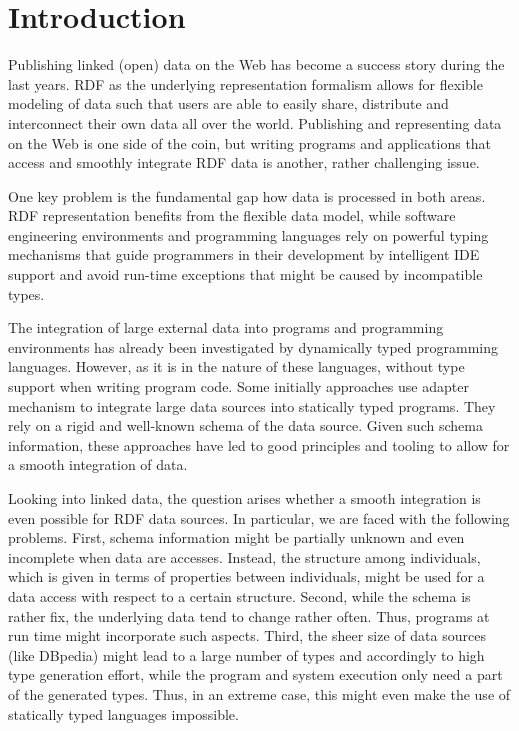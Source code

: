 \documentclass{llncs} %
\begin{document}
\section{Introduction}
\label{sec:intro}


Publishing linked (open) data on the Web has become a success story during the last years.
RDF as the underlying representation formalism allows for flexible modeling of data such that
users are able to easily share, distribute and interconnect their own data all over the world.
Publishing and representing data on the Web is one side of the coin, but writing programs
and applications that access and smoothly integrate RDF data  is another, rather challenging issue.

One key problem is the fundamental gap how data is processed in both areas.
RDF representation benefits from the flexible data model,
while software engineering environments and programming languages rely on powerful typing mechanisms
that guide programmers in their development by intelligent IDE support
and avoid run-time exceptions that might be caused by incompatible types.


The integration of large external data into programs and programming environments
has already been investigated by dynamically typed programming languages.
However, as it is in the nature of these languages, without type support when writing program code.
Some initially approaches use adapter mechanism to integrate large data sources into statically
typed programs. They rely on a rigid and well-known schema of the data source.
Given such schema information, these approaches have led to good principles and tooling to
allow for a smooth integration of data.

Looking into linked data, the question arises whether
a smooth integration is even possible for RDF data sources.
In particular, we are faced with the following problems.
First, schema information might be partially unknown and even incomplete when data are accesses.
Instead, the structure among individuals, which is given in terms of properties between individuals,
might be used for a data access with respect to a certain structure.
Second, while the schema is rather fix, the underlying data tend to change rather often.
Thus, programs at run time might incorporate such aspects.
Third, the sheer size of data sources (like DBpedia)  might lead to a large number of types
and accordingly to high type generation effort, while the program and system execution
only need a part of the generated types.
Thus, in an extreme case, this might even make the use of statically typed languages impossible.
\end{document}

